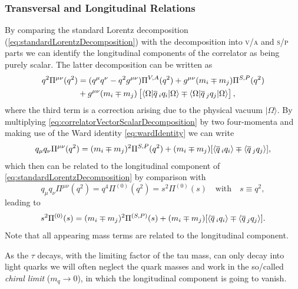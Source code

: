 \documentclass[../../index.tex]{subfiles}
\begin{document}
\subsubsection{Transversal and Longitudinal Relations}
By comparing the standard Lorentz decomposition
(\cref{eq:standardLorentzDecomposition}) with the decomposition into
\textsc{v}/\textsc{a} and \textsc{s}/\textsc{p} parts we can identify the
longitudinal components of the correlator as being purely scalar. The latter
decomposition can be written as \cite{Broadhurst1981,Jamin1992}
\begin{equation}
  \label{eq:correlatorVectorScalarDecomposition}
  \begin{split}
    q^2\Pi^{\mu\nu}(q^2) &= (q^\mu q^\nu - q^2 g^{\mu\nu}) \Pi^{V,A}(q^2) + g^{\mu\nu} (m_i \mp m_j)\Pi^{S,P}(q^2) \\
    &+ g^{\mu\nu}(m_i \mp m_j) \left[ \langle\Omega\vert \overline{q}\,_i q_i
      \vert\Omega\rangle \mp \langle\Omega\vert \overline{q}\,_j q_j
      \vert\Omega\rangle\right],
  \end{split}
\end{equation}
where the third term is a correction arising due to the physical vacuum
\(|\Omega\rangle\). By multiplying \cref{eq:correlatorVectorScalarDecomposition}
by two four-momenta and making use of the Ward identity \cref{eq:wardIdentity}
we can write
\begin{equation}
  q_\mu q_\nu \Pi^{\mu\nu}(q^2) = (m_i \mp m_j)^2 \Pi^{S,P}(q^2) + (m_i \mp m_j)[\langle \overline{q}\,_i q_i \rangle \mp \langle \overline{q}\,_j q_j \rangle],
\end{equation}
which then can be related to the longitudinal component of
\cref{eq:standardLorentzDecomposition} by comparison with
\begin{equation}
  q_\mu q_\nu \Pi^{\mu\nu}(q^2) = q^4 \Pi^{(0)}(q^2) = s^2 \Pi^{(0)}(s) \quad \text{with} \quad s\equiv q^2,
\end{equation}
leading to
\begin{equation}
  \label{eq:longitudinalTwoPointFunction}
  s^2 \Pi^{(0)}(s) = (m_i \mp m_j)^2 \Pi^{(S,P)}(s) + (m_i \mp m_j)[ \langle \overline{q}\,_i q_i \rangle \mp \langle \overline{q}\,_j q_j \rangle].
\end{equation}
Note that all appearing mass terms are related to the longitudinal component.

As the \(\tau\) decays, with the limiting factor of the tau mass, can only decay
into light quarks we will often neglect the quark masses and work in the
so\-/called \textit{chiral limit} (\(m_q \to 0\)), in which the longitudinal
component is going to vanish.
\end{document}
